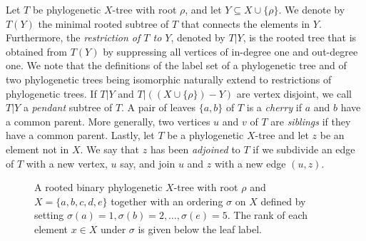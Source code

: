 \documentclass{article}
\begin{document}
Let $T$ be phylogenetic $X$-tree with root $\rho$, and let $Y \subseteq X \cup \{\rho \}$. We denote by $T(Y)$ the minimal rooted subtree of $T$ that connects the elements in $Y$. Furthermore, the {\em restriction of $T$ to $Y$}, denoted by $T|Y$, is the rooted tree that is obtained from $T(Y)$ by suppressing all vertices of in-degree one and out-degree one. We note that the definitions of the label set of a phylogenetic tree and of two phylogenetic trees being isomorphic naturally extend to restrictions of phylogenetic trees. If $T|Y$ and $T|((X\cup \{\rho\})-Y)$ are vertex disjoint, we call $T|Y$ a {\em pendant} subtree of $T$.
A pair of leaves $\{a,b\}$ of $T$ is a {\em cherry} if $a$ and $b$ have a common parent. More generally, two vertices $u$ and $v$ of $T$ are {\em siblings} if they have a common parent. 
Lastly, let $T$ be a phylogenetic $X$-tree and let $z$ be an element not in $X$. We say that $z$ has been {\em adjoined} to $T$ if we subdivide an edge of $T$ with a new vertex, $u$ say, and join $u$ and $z$ with a new edge $(u, z)$.

\begin{figure}[t!]
    \centering
    \caption{A rooted binary phylogenetic $X$-tree with root $\rho$ and $X = \{a,b,c,d,e\}$ together with an ordering $\sigma$ on $X$ defined by setting $\sigma(a)=1, \sigma(b)=2, \ldots, \sigma(e)=5$. The rank of each element $x \in X$ under $\sigma$ is given below the leaf label.}
    \label{fig:tree}
\end{figure}
\end{document}
